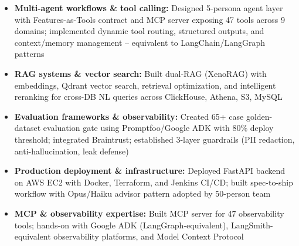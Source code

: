\documentclass[]{cover}
\begin{document}


\currentdate{\today}



{\raggedright{}\fontsize{11pt}{13pt}\selectfont
\begin{itemize}
    \item \textbf{Multi-agent workflows \& tool calling:} Designed 5-persona agent layer with Features-as-Tools contract and MCP server exposing 47 tools across 9 domains; implemented dynamic tool routing, structured outputs, and context/memory management -- equivalent to LangChain/LangGraph patterns
    \item \textbf{RAG systems \& vector search:} Built dual-RAG (XenoRAG) with embeddings, Qdrant vector search, retrieval optimization, and intelligent reranking for cross-DB NL queries across ClickHouse, Athena, S3, MySQL
    \item \textbf{Evaluation frameworks \& observability:} Created 65+ case golden-dataset evaluation gate using Promptfoo/Google ADK with 80\% deploy threshold; integrated Braintrust; established 3-layer guardrails (PII redaction, anti-hallucination, leak defense)
    \item \textbf{Production deployment \& infrastructure:} Deployed FastAPI backend on AWS EC2 with Docker, Terraform, and Jenkins CI/CD; built spec-to-ship workflow with Opus/Haiku advisor pattern adopted by 50-person team
    \item \textbf{MCP \& observability expertise:} Built MCP server for 47 observability tools; hands-on with Google ADK (LangGraph-equivalent), LangSmith-equivalent observability platforms, and Model Context Protocol
\end{itemize}\par}
\vspace{6pt}
\end{document}
